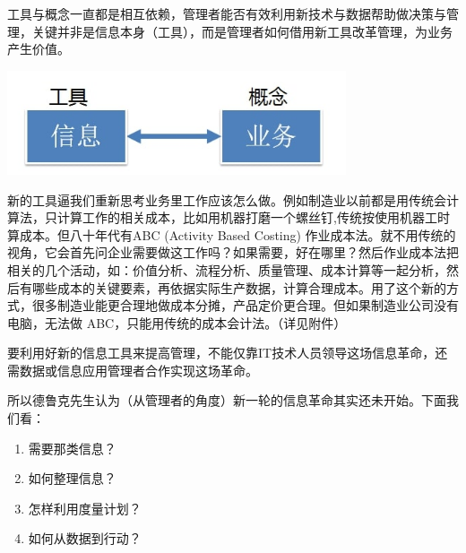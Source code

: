 工具与概念一直都是相互依赖，管理者能否有效利用新技术与数据帮助做决策与管理，关键并非是信息本身（工具），而是管理者如何借用新工具改革管理，为业务产生价值。


\includegraphics[width=10cm]{Drucker_4tu1_1.jpg}

新的工具逼我们重新思考业务里工作应该怎么做。例如制造业以前都是用传统会计算法，只计算工作的相关成本，比如用机器打磨一个螺丝钉,传统按使用机器工时算成本。但八十年代有ABC
(Activity Based Costing)
作业成本法。就不用传统的视角，它会首先问企业需要做这工作吗？如果需要，好在哪里？然后作业成本法把相关的几个活动，如：价值分析、流程分析、质量管理、成本计算等一起分析，然后有哪些成本的关键要素，再依据实际生产数据，计算合理成本。用了这个新的方式，很多制造业能更合理地做成本分摊，产品定价更合理。但如果制造业公司没有电脑，无法做
ABC，只能用传统的成本会计法。（详见附件）

要利用好新的信息工具来提高管理，不能仅靠IT技术人员领导这场信息革命，还需数据或信息应用管理者合作实现这场革命。


所以德鲁克先生认为（从管理者的角度）新一轮的信息革命其实还未开始。下面我们看：

\begin{enumerate}
\tightlist
\item
  需要那类信息？
\item
  如何整理信息？
\item
  怎样利用度量计划？
\item
  如何从数据到行动？
\end{enumerate}

